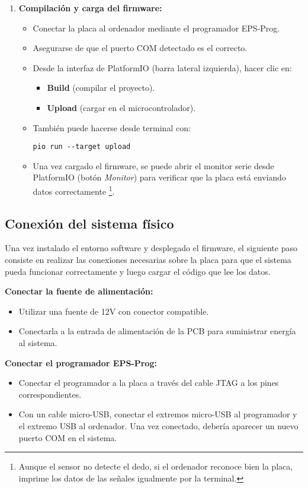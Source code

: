 \begin{enumerate}
  \item \textbf{Compilación y carga del firmware:}
  \begin{itemize}
    \item Conectar la placa al ordenador mediante el programador EPS-Prog.
    \item Asegurarse de que el puerto COM detectado es el correcto.
    \item Desde la interfaz de PlatformIO (barra lateral izquierda), hacer clic en:
    \begin{itemize}
      \item \textbf{Build} (compilar el proyecto).
      \item \textbf{Upload} (cargar en el microcontrolador).
    \end{itemize}
    \item También puede hacerse desde terminal con:
    \begin{verbatim}
pio run --target upload
    \end{verbatim}
    \item Una vez cargado el firmware, se puede abrir el monitor serie desde PlatformIO (botón \textit{Monitor}) para verificar que la placa está enviando datos correctamente \footnote{Aunque el sensor no detecte el dedo, si el ordenador reconoce bien la placa, imprime los datos de las señales igualmente por la terminal.}.
  \end{itemize}
\end{enumerate} 

\subsection{Conexión del sistema físico}

Una vez instalado el entorno software y desplegado el firmware, el siguiente paso consiste en realizar las conexiones necesarias sobre la placa para que el sistema pueda funcionar correctamente y luego cargar el código que lee los datos. 

\textbf{Conectar la fuente de alimentación:}
  \begin{itemize}
    \item Utilizar una fuente de 12V con conector compatible.
    \item Conectarla a la entrada de alimentación de la PCB para suministrar energía al sistema.
  \end{itemize}

\textbf{Conectar el programador EPS-Prog:}
  \begin{itemize}
    \item Conectar el programador a la placa a través del cable JTAG a los pines correspondientes.
    \item Con un cable micro-USB, conectar el extremos micro-USB al programador y el extremo USB al ordenador. Una vez conectado, debería aparecer un nuevo puerto COM en el sistema.
  \end{itemize}

